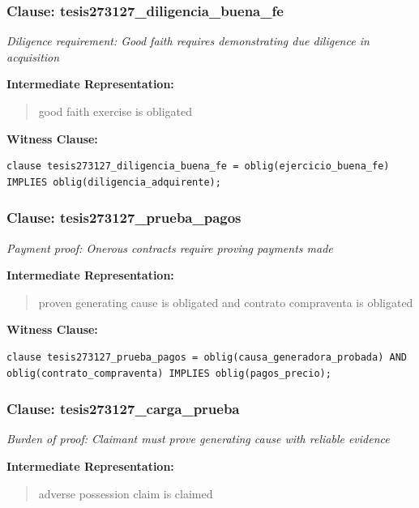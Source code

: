 \documentclass[11pt,a4paper]{article}
\begin{document}
\subsubsection{Clause: tesis273127\_diligencia\_buena\_fe}

\textit{Diligence requirement: Good faith requires demonstrating due diligence in acquisition}

\textbf{Intermediate Representation:}

\begin{quote}
good faith exercise is obligated
\end{quote}

\textbf{Witness Clause:}

\begin{lstlisting}[style=witnessstyle, language=Witness]
clause tesis273127_diligencia_buena_fe = oblig(ejercicio_buena_fe) IMPLIES oblig(diligencia_adquirente);
\end{lstlisting}

\subsubsection{Clause: tesis273127\_prueba\_pagos}

\textit{Payment proof: Onerous contracts require proving payments made}

\textbf{Intermediate Representation:}

\begin{quote}
proven generating cause is obligated and contrato compraventa is obligated
\end{quote}

\textbf{Witness Clause:}

\begin{lstlisting}[style=witnessstyle, language=Witness]
clause tesis273127_prueba_pagos = oblig(causa_generadora_probada) AND oblig(contrato_compraventa) IMPLIES oblig(pagos_precio);
\end{lstlisting}

\subsubsection{Clause: tesis273127\_carga\_prueba}

\textit{Burden of proof: Claimant must prove generating cause with reliable evidence}

\textbf{Intermediate Representation:}

\begin{quote}
adverse possession claim is claimed
\end{quote}
\end{document}

